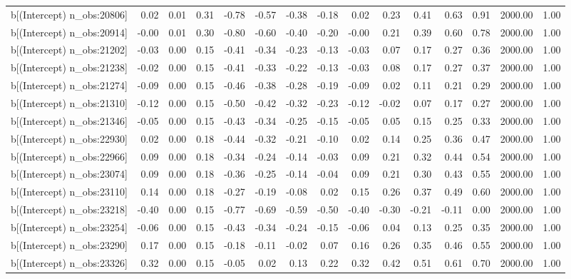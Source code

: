 \begin{table}[ht]
\begin{tabular}{rrrrrrrrrrrrrrr}
  b[(Intercept) n\_obs:20806] & 0.02 & 0.01 & 0.31 & -0.78 & -0.57 & -0.38 & -0.18 & 0.02 & 0.23 & 0.41 & 0.63 & 0.91 & 2000.00 & 1.00 \\ 
  b[(Intercept) n\_obs:20914] & -0.00 & 0.01 & 0.30 & -0.80 & -0.60 & -0.40 & -0.20 & -0.00 & 0.21 & 0.39 & 0.60 & 0.78 & 2000.00 & 1.00 \\ 
  b[(Intercept) n\_obs:21202] & -0.03 & 0.00 & 0.15 & -0.41 & -0.34 & -0.23 & -0.13 & -0.03 & 0.07 & 0.17 & 0.27 & 0.36 & 2000.00 & 1.00 \\ 
  b[(Intercept) n\_obs:21238] & -0.02 & 0.00 & 0.15 & -0.41 & -0.33 & -0.22 & -0.13 & -0.03 & 0.08 & 0.17 & 0.27 & 0.37 & 2000.00 & 1.00 \\ 
  b[(Intercept) n\_obs:21274] & -0.09 & 0.00 & 0.15 & -0.46 & -0.38 & -0.28 & -0.19 & -0.09 & 0.02 & 0.11 & 0.21 & 0.29 & 2000.00 & 1.00 \\ 
  b[(Intercept) n\_obs:21310] & -0.12 & 0.00 & 0.15 & -0.50 & -0.42 & -0.32 & -0.23 & -0.12 & -0.02 & 0.07 & 0.17 & 0.27 & 2000.00 & 1.00 \\ 
  b[(Intercept) n\_obs:21346] & -0.05 & 0.00 & 0.15 & -0.43 & -0.34 & -0.25 & -0.15 & -0.05 & 0.05 & 0.15 & 0.25 & 0.33 & 2000.00 & 1.00 \\ 
  b[(Intercept) n\_obs:22930] & 0.02 & 0.00 & 0.18 & -0.44 & -0.32 & -0.21 & -0.10 & 0.02 & 0.14 & 0.25 & 0.36 & 0.47 & 2000.00 & 1.00 \\ 
  b[(Intercept) n\_obs:22966] & 0.09 & 0.00 & 0.18 & -0.34 & -0.24 & -0.14 & -0.03 & 0.09 & 0.21 & 0.32 & 0.44 & 0.54 & 2000.00 & 1.00 \\ 
  b[(Intercept) n\_obs:23074] & 0.09 & 0.00 & 0.18 & -0.36 & -0.25 & -0.14 & -0.04 & 0.09 & 0.21 & 0.30 & 0.43 & 0.55 & 2000.00 & 1.00 \\ 
  b[(Intercept) n\_obs:23110] & 0.14 & 0.00 & 0.18 & -0.27 & -0.19 & -0.08 & 0.02 & 0.15 & 0.26 & 0.37 & 0.49 & 0.60 & 2000.00 & 1.00 \\ 
  b[(Intercept) n\_obs:23218] & -0.40 & 0.00 & 0.15 & -0.77 & -0.69 & -0.59 & -0.50 & -0.40 & -0.30 & -0.21 & -0.11 & 0.00 & 2000.00 & 1.00 \\ 
  b[(Intercept) n\_obs:23254] & -0.06 & 0.00 & 0.15 & -0.43 & -0.34 & -0.24 & -0.15 & -0.06 & 0.04 & 0.13 & 0.25 & 0.35 & 2000.00 & 1.00 \\ 
  b[(Intercept) n\_obs:23290] & 0.17 & 0.00 & 0.15 & -0.18 & -0.11 & -0.02 & 0.07 & 0.16 & 0.26 & 0.35 & 0.46 & 0.55 & 2000.00 & 1.00 \\ 
  b[(Intercept) n\_obs:23326] & 0.32 & 0.00 & 0.15 & -0.05 & 0.02 & 0.13 & 0.22 & 0.32 & 0.42 & 0.51 & 0.61 & 0.70 & 2000.00 & 1.00 \\ 

\end{tabular}
\end{table}
